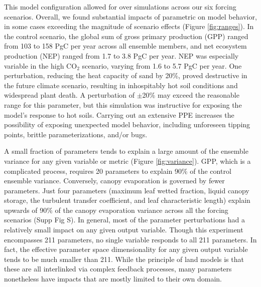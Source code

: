 \documentclass[draft]{agujournal2019}
\begin{document}
This model configuration allowed for over   simulations across our six forcing scenarios.
Overall, we found substantial impacts of parametric   on model behavior, in some cases exceeding the magnitude of scenario effects (Figure \ref{fig:ranges}). In the control scenario, the global sum of gross primary production (GPP) ranged from 103 to 158 PgC per year across all ensemble members, and net ecosystem production (NEP) ranged from 1.7 to 3.8 PgC per year. NEP was especially variable in the high CO$_2$ scenario, varying from 1.6 to 5.7 PgC per year. One perturbation, reducing the heat capacity of sand by 20\%, proved destructive in the future climate scenario, resulting in inhospitably hot soil conditions and widespread plant death. A perturbation of $\pm$20\% may exceed the reasonable range for this parameter, but this simulation was instructive for exposing the model's response to hot soils. Carrying out an extensive PPE increases the possibility of exposing unexpected model behavior, including unforeseen tipping points, brittle parameterizations, and/or bugs.

A small fraction of parameters tends to explain a large amount of the ensemble variance for any given variable or metric (Figure \ref{fig:variance}). GPP, which is a complicated process, requires 20 parameters to explain 90\% of the control ensemble variance. Conversely, canopy evaporation is governed by fewer parameters.  Just four parameters (maximum leaf wetted fraction, liquid canopy storage, the turbulent transfer coefficient, and leaf characteristic length) explain upwards of 90\% of the canopy evaporation variance across all the forcing scenarios (Supp Fig S). In general, most of the parameter perturbations had a relatively small impact on any given output variable. Though this experiment encompasses 211 parameters, no single variable responds to all 211 parameters. In fact, the effective parameter space dimensionality for any given output variable tends to be much smaller than 211. While the principle of land models is that these are all interlinked via complex feedback processes, many parameters nonetheless have impacts that are mostly limited to their own domain. 
\end{document}
